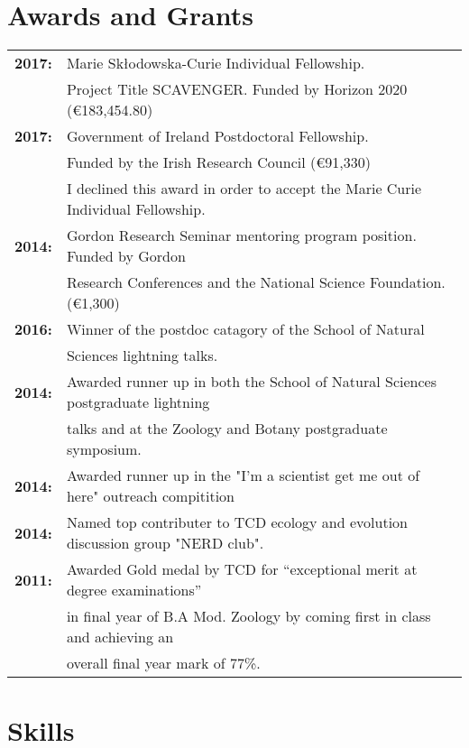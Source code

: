 \documentclass[10pt,a4paper]{article}
\begin{document}

\section{Awards and Grants}


\begin{tabular}{ll}
\textbf{2017:} & Marie Skłodowska-Curie Individual Fellowship.\\
& Project Title SCAVENGER. Funded by Horizon 2020 (\euro 183,454.80)\\
\textbf{2017:} & Government of Ireland Postdoctoral Fellowship.\\
& Funded by the Irish Research Council (\euro 91,330)\\
& I declined this award in order to accept the Marie Curie Individual Fellowship.\\
\textbf{2014:} & Gordon Research Seminar mentoring program position. Funded by Gordon\\
& Research Conferences and the National Science Foundation. (\euro 1,300)\\

\textbf{2016:} & Winner of the postdoc catagory of the School of Natural\\
& Sciences lightning talks.\\
\textbf{2014:} & Awarded runner up in both the School of Natural Sciences postgraduate lightning\\
& talks and at the Zoology and Botany postgraduate symposium.\\
\textbf{2014:} & Awarded runner up in the "I'm a scientist get me out of here" outreach compitition\\
\textbf{2014:} & Named top contributer to TCD ecology and evolution discussion group "NERD club".\\
\textbf{2011:} & Awarded Gold medal by TCD for “exceptional merit at degree examinations”\\
& in final year of B.A Mod. Zoology by coming first in class and achieving an\\
& overall final year mark of 77\%.\\
\end{tabular}

\bigskip


\clearpage
\bigskip
\section{Skills}
\end{document}
